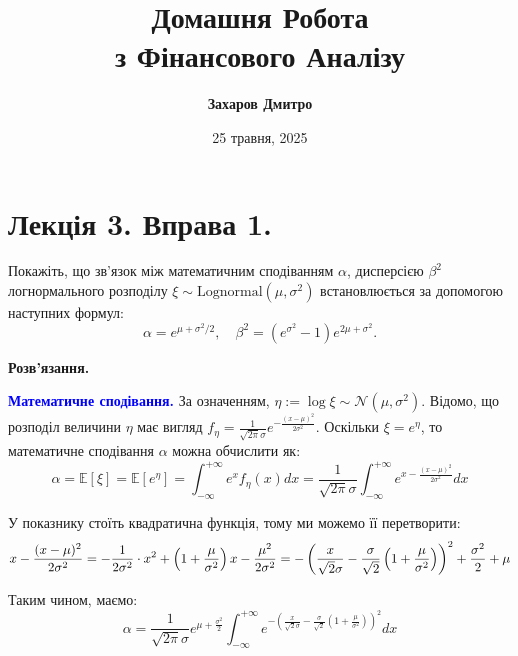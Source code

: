 \documentclass{hw_template}
\title{\bfseries Домашня Робота \\з Фінансового Аналізу}
\author{\bfseries Захаров Дмитро}
\date{25 травня, 2025}
\begin{document}
\pagestyle{fancy}

\maketitle

\tableofcontents

\newpage

\section{Лекція 3. Вправа 1.}

\begin{problem}
    Покажіть, що зв'язок між математичним сподіванням $\alpha$, дисперсією
    $\beta^2$ логнормального розподілу $\xi \sim \text{Lognormal}(\mu,\sigma^2)$
    встановлюється за допомогою наступних формул:
    \begin{equation*}
        \alpha = e^{\mu + \sigma^2/2}, \quad \beta^2 = (e^{\sigma^2}-1)e^{2\mu+\sigma^2}.
    \end{equation*}
\end{problem}

\textbf{Розв'язання.} 

\textcolor{blue}{\textbf{Математичне сподівання.}} За означенням, $\eta := \log
\xi \sim \mathcal{N}(\mu,\sigma^2)$. Відомо, що розподіл величини $\eta$ має
вигляд $f_{\eta} = \frac{1}{\sqrt{2\pi}\sigma}e^{-\frac{(x-\mu)^2}{2\sigma^2}}$.
Оскільки $\xi=e^{\eta}$, то математичне сподівання $\alpha$ можна обчислити як:
\begin{equation*}
    \alpha = \mathbb{E}[\xi] = \mathbb{E}[e^{\eta}] = \int_{-\infty}^{+\infty}e^x f_{\eta}(x)dx = \frac{1}{\sqrt{2\pi}\sigma}\int_{-\infty}^{+\infty} e^{x-\frac{(x-\mu)^2}{2\sigma^2}}dx
\end{equation*}

У показнику стоїть квадратична функція, тому ми можемо її перетворити:
\begin{equation*}
    \footnotesize x-\frac{(x-\mu)^2}{2\sigma^2} = -\frac{1}{2\sigma^2}\cdot x^2 + \left(1+\frac{\mu}{\sigma^2}\right)x - \frac{\mu^2}{2\sigma^2} = -\left(\frac{x}{\sqrt{2}\sigma}-\frac{\sigma}{\sqrt{2}}\left(1+\frac{\mu}{\sigma^2}\right)\right)^2 + \frac{\sigma^2}{2} + \mu
\end{equation*}

Таким чином, маємо:
\begin{equation*}
    \alpha = \frac{1}{\sqrt{2\pi}\sigma}e^{\mu+\frac{\sigma^2}{2}}\int_{-\infty}^{+\infty}e^{-\left(\frac{x}{\sqrt{2}\sigma}-\frac{\sigma}{\sqrt{2}}\left(1+\frac{\mu}{\sigma^2}\right)\right)^2}dx
\end{equation*}
\end{document}
